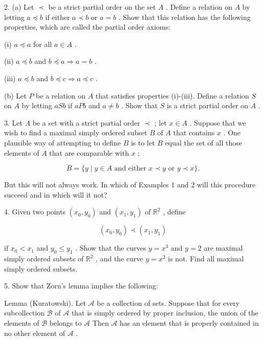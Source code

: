 2. (a) Let \(\prec\) be a strict partial order on the set \(A\) . Define a relation on \(A\) by letting \(a \preccurlyeq  b\) if either \(a \prec  b\) or \(a = b\) . Show that this relation has the following properties, which are called the partial order axioms:

(i) \(a \preccurlyeq  a\) for all \(a \in  A\) .

(ii) \(a \preccurlyeq  b\) and \(b \preccurlyeq  a \Rightarrow  a = b\) .

(iii) \(a \preccurlyeq  b\) and \(b \preccurlyeq  c \Rightarrow  a \preccurlyeq  c\) .

(b) Let \(P\) be a relation on \(A\) that satisfies properties (i)-(iii). Define a relation \(S\) on \(A\) by letting \({aSb}\) if \({aPb}\) and \(a \neq  b\) . Show that \(S\) is a strict partial order on \(A\) .

3. Let \(A\) be a set with a strict partial order \(\prec\) ; let \(x \in  A\) . Suppose that we wish to find a maximal simply ordered subset \(B\) of \(A\) that contains \(x\) . One plausible way of attempting to define \(B\) is to let \(B\) equal the set of all those elements of \(A\) that are comparable with \(x\) ;

\[
B = \{ y \mid  y \in  A\text{ and either }x \prec  y\text{ or }y \prec  x\} .
\]

But this will not always work. In which of Examples 1 and 2 will this procedure succeed and in which will it not?

4. Given two points \(\left( {{x}_{0},{y}_{0}}\right)\) and \(\left( {{x}_{1},{y}_{1}}\right)\) of \({\mathbb{R}}^{2}\) , define

\[
\left( {{x}_{0},{y}_{0}}\right)  \prec  \left( {{x}_{1},{y}_{1}}\right)
\]

if \({x}_{0} < {x}_{1}\) and \({y}_{0} \leq  {y}_{1}\) . Show that the curves \(y = {x}^{3}\) and \(y = 2\) are maximal simply ordered subsets of \({\mathbb{R}}^{2}\) , and the curve \(y = {x}^{2}\) is not. Find all maximal simply ordered subsets.

5. Show that Zorn's lemma implies the following:

Lemma (Kuratowski). Let \(\mathcal{A}\) be a collection of sets. Suppose that for every subcollection \(\mathcal{B}\) of \(\mathcal{A}\) that is simply ordered by proper inclusion, the union of the elements of \(\mathcal{B}\) belongs to \(\mathcal{A}\) Then \(\mathcal{A}\) has an element that is properly contained in no other element of \(\mathcal{A}\) .

